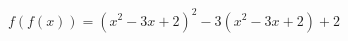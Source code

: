 \documentclass[preview]{standalone}
\begin{document}
\begin{align*}
f(f(x)) = (x^2 - 3x + 2)^2 - 3(x^2 - 3x + 2) + 2
\end{align*}
\end{document}
